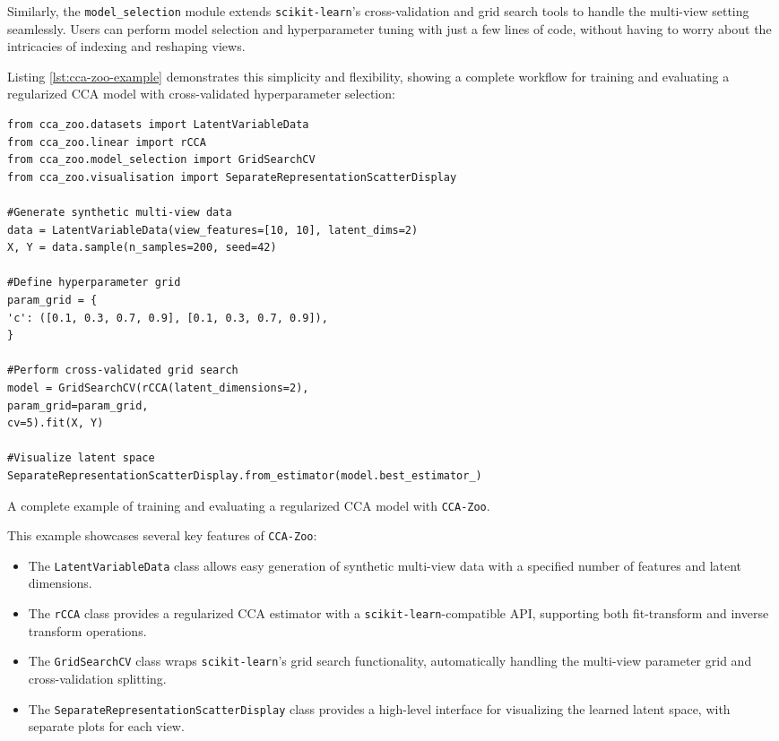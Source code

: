 Similarly, the \texttt{model\_selection} module extends \texttt{scikit-learn}'s cross-validation and grid search tools to handle the multi-view setting seamlessly. Users can perform model selection and hyperparameter tuning with just a few lines of code, without having to worry about the intricacies of indexing and reshaping views.

Listing \ref{lst:cca-zoo-example} demonstrates this simplicity and flexibility, showing a complete workflow for training and evaluating a regularized CCA model with cross-validated hyperparameter selection:

\begin{listing}[ht]
\begin{verbatim}
from cca_zoo.datasets import LatentVariableData
from cca_zoo.linear import rCCA
from cca_zoo.model_selection import GridSearchCV
from cca_zoo.visualisation import SeparateRepresentationScatterDisplay

#Generate synthetic multi-view data
data = LatentVariableData(view_features=[10, 10], latent_dims=2)
X, Y = data.sample(n_samples=200, seed=42)

#Define hyperparameter grid
param_grid = {
'c': ([0.1, 0.3, 0.7, 0.9], [0.1, 0.3, 0.7, 0.9]),
}

#Perform cross-validated grid search
model = GridSearchCV(rCCA(latent_dimensions=2),
param_grid=param_grid,
cv=5).fit(X, Y)

#Visualize latent space
SeparateRepresentationScatterDisplay.from_estimator(model.best_estimator_)
\end{verbatim}
\caption{A complete example of training and evaluating a regularized CCA model with \texttt{CCA-Zoo}.}
\label{lst:cca-zoo-example}
\end{listing}

This example showcases several key features of \texttt{CCA-Zoo}:

\begin{itemize}
\item The \texttt{LatentVariableData} class allows easy generation of synthetic multi-view data with a specified number of features and latent dimensions.
\item The \texttt{rCCA} class provides a regularized CCA estimator with a \texttt{scikit-learn}-compatible API, supporting both fit-transform and inverse transform operations.
\item The \texttt{GridSearchCV} class wraps \texttt{scikit-learn}'s grid search functionality, automatically handling the multi-view parameter grid and cross-validation splitting.
\item The \texttt{SeparateRepresentationScatterDisplay} class provides a high-level interface for visualizing the learned latent space, with separate plots for each view.
\end{itemize}


